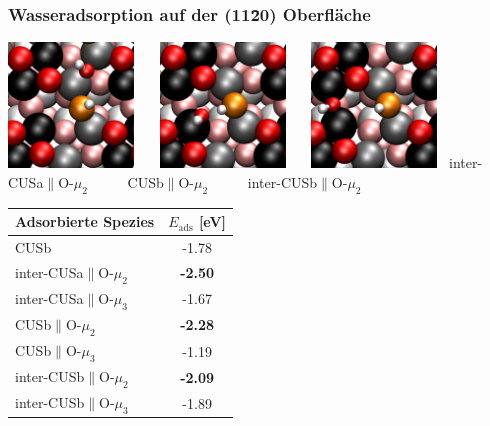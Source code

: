 \documentclass[hyperref={pdfpagelabels=false}]{beamer}
\begin{document}
\begin{frame}
 \frametitle{Wasseradsorption auf der (11\=20) Oberfläche}
 \centering
\includegraphics[width=0.25\textwidth]{figures/test-iCa2.pdf}~~~
\includegraphics[width=0.25\textwidth]{figures/test-Cb2.pdf}~~~
\includegraphics[width=0.25\textwidth]{figures/test-iCb2.pdf}~\newline
inter-CUSa$\parallel$O-$\mu_2$ ~~~~~CUSb$\parallel$O-$\mu_2$  ~~~~~inter-CUSb$\parallel$O-$\mu_2$~~~
\begin{table}[!ht]
  \centering
 \begin{tabular}{l|c}
  \toprule
   Adsorbierte Spezies  & $E_\textrm{ads}$  [eV] \\\midrule
 CUSb          &   -1.78   \\\hline
 inter-CUSa$\parallel$O-$\mu_2$ & \textbf{-2.50}  \\
 inter-CUSa$\parallel$O-$\mu_3$ & -1.67  \\
 CUSb$\parallel$O-$\mu_2$ & \textbf{-2.28}  \\
 CUSb$\parallel$O-$\mu_3$ & -1.19  \\
 inter-CUSb$\parallel$O-$\mu_2$ & \textbf{-2.09} \\
 inter-CUSb$\parallel$O-$\mu_3$ & -1.89 \\\bottomrule
  \end{tabular}
  \label{tab:ads_1water}
\end{table}

\end{frame}
\end{document}
